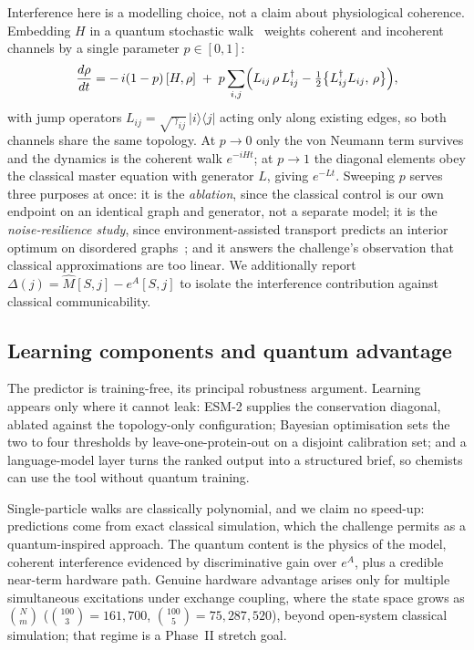 \documentclass[10pt,a4paper]{article}
\newcommand{\Mhat}{\hat{M}}
\begin{document}
Interference here is a modelling choice, not a claim about physiological coherence. Embedding $H$ in
a quantum stochastic walk~\cite{whitfield2010} weights coherent and incoherent channels by a single
parameter $p \in [0,1]$:
\begin{equation}
\frac{d\rho}{dt}
 = -\,i(1-p)\,[H,\rho]
 \;+\; p\sum_{i,j}\Bigl(L_{ij}\,\rho\,L_{ij}^{\dagger}
        - \tfrac{1}{2}\bigl\{L_{ij}^{\dagger}L_{ij},\,\rho\bigr\}\Bigr),
\end{equation}
with jump operators $L_{ij} = \sqrt{\gamma_{ij}}\,|i\rangle\langle j|$ acting only along existing
edges, so both channels share the same topology. At $p \to 0$ only the von Neumann term survives and
the dynamics is the coherent walk $e^{-iHt}$; at $p \to 1$ the diagonal elements obey the classical
master equation with generator $L$, giving $e^{-Lt}$. Sweeping $p$ serves three purposes at once: it is the \emph{ablation}, since the classical
control is our own endpoint on an identical graph and generator, not a separate model; it is
the \emph{noise-resilience study}, since environment-assisted transport predicts an interior optimum
on disordered graphs~\cite{rebentrost2009}; and it answers the challenge's observation that
classical approximations are too linear. We additionally report
$\Delta(j) = \Mhat[S,j] - e^{A}[S,j]$ to isolate the interference contribution against classical
communicability.

\subsection{Learning components and quantum advantage}

The predictor is training-free, its principal robustness argument. Learning appears only where it
cannot leak: ESM-2 supplies the conservation diagonal, ablated against the topology-only
configuration; Bayesian optimisation sets the two to four thresholds by leave-one-protein-out on a
disjoint calibration set; and a language-model layer turns the ranked output into a structured brief,
so chemists can use the tool without quantum training.

Single-particle walks are classically polynomial, and we claim no speed-up: predictions come from
exact classical simulation, which the challenge permits as a quantum-inspired approach. The quantum content is the physics of the model, coherent interference
evidenced by discriminative gain over $e^{A}$, plus a credible near-term hardware path. Genuine
hardware advantage arises only for multiple simultaneous excitations under exchange coupling, where
the state space grows as $\binom{N}{m}$ ($\binom{100}{3} = 161{,}700$, $\binom{100}{5} =
75{,}287{,}520$), beyond open-system classical simulation; that regime is a Phase~II stretch goal.
\end{document}
